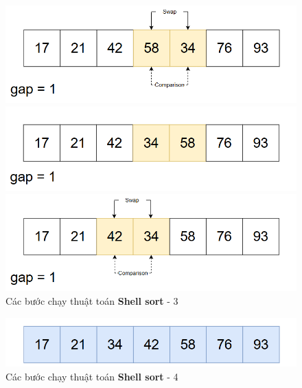 \begin{figure}[H]
    \includegraphics[width=0.5\linewidth]{img/shell_sort/22.png}
    \vspace{0.15cm}

    \includegraphics[width=0.5\linewidth]{img/shell_sort/23.png}
    \vspace{0.15cm}

    \includegraphics[width=0.5\linewidth]{img/shell_sort/24.png}
    \caption{Các bước chạy thuật toán \textbf{Shell sort} - 3}
\end{figure}

\begin{figure}[H]
    \centering
    \includegraphics[width=0.5\linewidth]{img/shell_sort/25.png}
    \caption{Các bước chạy thuật toán \textbf{Shell sort} - 4}
\end{figure}


